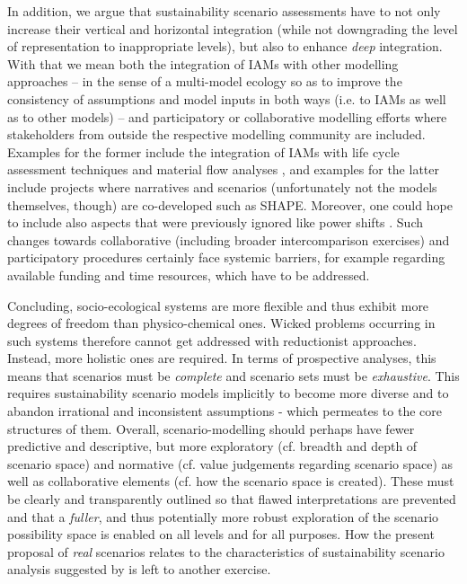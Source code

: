 \documentclass{article}
\begin{document}
\begin{refsection}
In addition, we argue that sustainability scenario assessments have to not only increase their vertical and horizontal integration (while not downgrading the level of representation to inappropriate levels), but also to enhance \textit{deep} integration. With that we mean both the integration of IAMs with other modelling approaches -- in the sense of a multi-model ecology \parencite{bollinger_2015} so as to improve the consistency of assumptions and model inputs in both ways (i.e. to IAMs as well as to other models) -- and participatory or collaborative modelling efforts where stakeholders from outside the respective modelling community are included. Examples for the former include the integration of IAMs with life cycle assessment techniques \parencite[e.g.][]{luderer_2019} and material flow analyses \parencite[for an overview see:][]{baars_2022,kullmann_2021}, and examples for the latter include projects where narratives and scenarios (unfortunately not the models themselves, though) are co-developed such as SHAPE. Moreover, one could hope to include also aspects that were previously ignored like power shifts \parencite{rutting_2022}. Such changes towards collaborative (including broader intercomparison exercises) and participatory procedures certainly face systemic barriers, for example regarding available funding and time resources, which have to be addressed.

Concluding, socio-ecological systems are more flexible and thus exhibit more degrees of freedom than physico-chemical ones. Wicked problems occurring in such systems therefore cannot get addressed with reductionist approaches. Instead, more holistic ones are required. In terms of prospective analyses, this means that scenarios must be \textit{complete} and scenario sets must be \textit{exhaustive}. This requires sustainability scenario models implicitly to become more diverse and to abandon irrational and inconsistent assumptions - which permeates to the core structures of them. Overall, scenario-modelling should perhaps have fewer predictive and descriptive, but more exploratory (cf. breadth and depth of scenario space) and normative (cf. value judgements regarding scenario space) as well as collaborative elements (cf. how the scenario space is created). These must be clearly and transparently outlined so that flawed interpretations are prevented and that a \textit{fuller}, and thus potentially more robust exploration of the scenario possibility space is enabled on all levels and for all purposes. How the present proposal of \textit{real} scenarios relates to the characteristics of sustainability scenario analysis suggested by \textcite{swart_2004} is left to another exercise.





\end{refsection}
\end{document}
